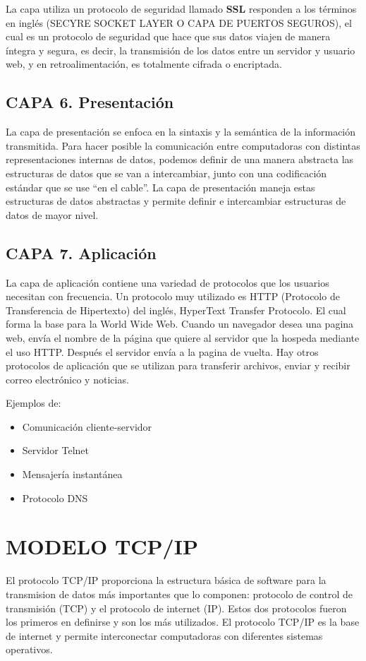 \documentclass[letterpaper,12pt]{article}
\begin{document}
\begin{sloppypar}
La capa utiliza un protocolo de seguridad llamado \textbf{SSL} responden a los términos en inglés (SECYRE SOCKET LAYER O CAPA DE PUERTOS SEGUROS), el cual es un protocolo de seguridad que hace que sus datos viajen de manera íntegra y segura, es decir, la transmisión de los datos entre un servidor y usuario web, y en retroalimentación, es totalmente cifrada o encriptada.

\subsection{CAPA 6. Presentación}
La capa de presentación se enfoca en la sintaxis y la semántica de la información transmitida. Para hacer posible la comunicación entre computadoras con distintas representaciones internas de datos, podemos definir de una manera abstracta las estructuras de datos que se van a intercambiar, junto con una codificación estándar que se use “en el cable”. La capa de presentación maneja estas estructuras de datos abstractas y permite definir e intercambiar estructuras de datos de mayor nivel.

\subsection{CAPA 7. Aplicación}
La capa de aplicación contiene una variedad de protocolos que los usuarios necesitan con frecuencia. Un protocolo muy utilizado es HTTP (Protocolo de Transferencia de Hipertexto) del inglés, HyperText Transfer Protocolo. El cual forma la base para la World Wide Web. Cuando un navegador desea una pagina web, envía el nombre de la página que quiere al servidor que la hospeda mediante el uso HTTP. Después el servidor envía a la pagina de vuelta. Hay otros protocolos de aplicación que se utilizan para transferir archivos, enviar y recibir correo electrónico y noticias.

Ejemplos de: 
\begin{itemize}
    \item Comunicación cliente-servidor
    \item Servidor Telnet 
    \item Mensajería instantánea
    \item Protocolo DNS
\end{itemize}

\section{MODELO TCP/IP}
El protocolo TCP/IP proporciona la estructura básica de software para la transmision de datos más importantes que lo componen: protocolo de control de transmisión (TCP) y el protocolo de internet (IP). Estos dos protocolos fueron los primeros en definirse y son los más utilizados. El protocolo TCP/IP es la base de internet y permite interconectar computadoras con diferentes sistemas operativos.


\end{sloppypar}
\end{document}
